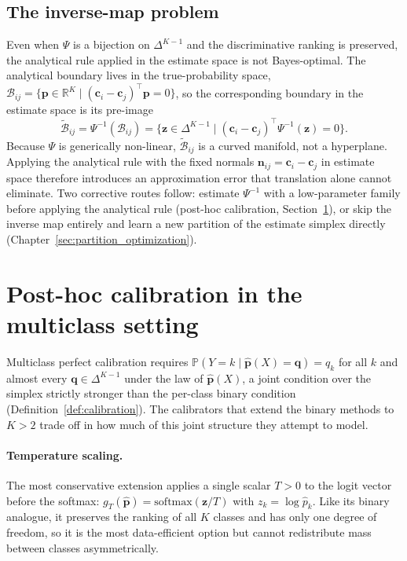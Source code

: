 \subsection{The inverse-map problem}

Even when $\Psi$ is a bijection on $\Delta^{K-1}$ and the discriminative ranking is preserved, the analytical rule applied in the estimate space is not Bayes-optimal. The analytical boundary lives in the true-probability space, $\mathcal{B}_{ij} = \{\mathbf{p} \in \mathbb{R}^K \mid (\mathbf{c}_i - \mathbf{c}_j)^\top \mathbf{p} = 0\}$, so the corresponding boundary in the estimate space is its pre-image
\begin{equation}
    \tilde{\mathcal{B}}_{ij} = \Psi^{-1}(\mathcal{B}_{ij}) = \{ \mathbf{z} \in \Delta^{K-1} \mid (\mathbf{c}_i - \mathbf{c}_j)^\top \Psi^{-1}(\mathbf{z}) = 0 \}.
\end{equation}
Because $\Psi$ is generically non-linear, $\tilde{\mathcal{B}}_{ij}$ is a curved manifold, not a hyperplane. Applying the analytical rule with the fixed normals $\mathbf{n}_{ij} = \mathbf{c}_i - \mathbf{c}_j$ in estimate space therefore introduces an approximation error that translation alone cannot eliminate. Two corrective routes follow: estimate $\Psi^{-1}$ with a low-parameter family before applying the analytical rule (post-hoc calibration, Section~\ref{sec:multiclass_calibration}), or skip the inverse map entirely and learn a new partition of the estimate simplex directly (Chapter~\ref{sec:partition_optimization}).

\section{Post-hoc calibration in the multiclass setting}\label{sec:multiclass_calibration}

Multiclass perfect calibration requires $\mathbb{P}(Y{=}k \mid \hat{\mathbf{p}}(X) = \mathbf{q}) = q_k$ for all $k$ and almost every $\mathbf{q} \in \Delta^{K-1}$ under the law of $\hat{\mathbf{p}}(X)$, a joint condition over the simplex strictly stronger than the per-class binary condition (Definition~\ref{def:calibration}). The calibrators that extend the binary methods to $K > 2$ trade off in how much of this joint structure they attempt to model.

\paragraph{Temperature scaling.} The most conservative extension \citep{guo2017calibration} applies a single scalar $T > 0$ to the logit vector before the softmax: $g_T(\hat{\mathbf{p}}) = \mathrm{softmax}(\mathbf{z}/T)$ with $z_k = \log \hat{p}_k$. Like its binary analogue, it preserves the ranking of all $K$ classes and has only one degree of freedom, so it is the most data-efficient option but cannot redistribute mass between classes asymmetrically.

